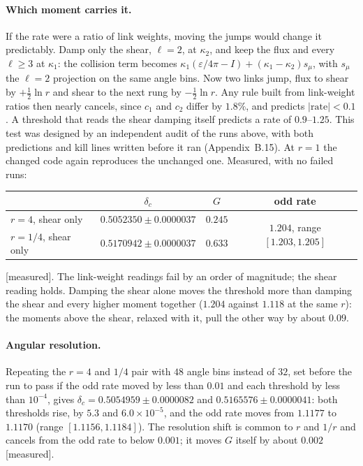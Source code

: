 \documentclass[11pt]{article}
\newcommand{\grade}[1]{\textsf{\small[#1]}}
\begin{document}
\paragraph{Which moment carries it.} If the rate were a ratio of link weights, moving the jumps would change it predictably. Damp only the shear, $\ell=2$, at $\kappa_2$, and keep the flux and every $\ell\ge3$ at $\kappa_1$: the collision term becomes $\kappa_1(\varepsilon/4\pi-I)+(\kappa_1-\kappa_2)s_\mu$, with $s_\mu$ the $\ell=2$ projection on the same angle bins. Now two links jump, flux to shear by $+\tfrac12\ln r$ and shear to the next rung by $-\tfrac12\ln r$. Any rule built from link-weight ratios then nearly cancels, since $c_1$ and $c_2$ differ by $1.8\%$, and predicts $|\text{rate}|<0.1$. A threshold that reads the shear damping itself predicts a rate of $0.9$--$1.25$. This test was designed by an independent audit of the runs above, with both predictions and kill lines written before it ran (Appendix~B.15). At $r=1$ the changed code again reproduces the unchanged one. Measured, with no failed runs:
\begin{center}\begin{tabular}{lccc}\toprule
& $\delta_c$ & $G$ & odd rate\\\midrule
$r=4$, shear only & $0.5052350\pm0.0000037$ & $0.245$ & \multirow{2}{*}{$1.204$, range $[1.203,1.205]$}\\
$r=1/4$, shear only & $0.5170942\pm0.0000037$ & $0.633$ & \\\bottomrule\end{tabular}\end{center}
\grade{measured}. The link-weight readings fail by an order of magnitude; the shear reading holds. Damping the shear alone moves the threshold more than damping the shear and every higher moment together ($1.204$ against $1.118$ at the same $r$): the moments above the shear, relaxed with it, pull the other way by about $0.09$.

\paragraph{Angular resolution.} Repeating the $r=4$ and $1/4$ pair with $48$ angle bins instead of $32$, set before the run to pass if the odd rate moved by less than $0.01$ and each threshold by less than $10^{-4}$, gives $\delta_c=0.5054959\pm0.0000082$ and $0.5165576\pm0.0000041$: both thresholds rise, by $5.3$ and $6.0\times10^{-5}$, and the odd rate moves from $1.1177$ to $1.1170$ (range $[1.1156,1.1184]$). The resolution shift is common to $r$ and $1/r$ and cancels from the odd rate to below $0.001$; it moves $G$ itself by about $0.002$ \grade{measured}.
\end{document}
